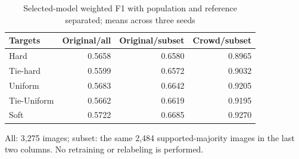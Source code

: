 \begin{table}[t]
\caption{Selected-model weighted F1 with population and reference separated; means across three seeds}\label{tab:samef1}
\centering\begin{tabular}{lrrr}\toprule
Targets & Original/all & Original/subset & Crowd/subset\\\midrule
Hard & 0.5658 & 0.6580 & 0.8965\\
Tie-hard & 0.5599 & 0.6572 & 0.9032\\
Uniform & 0.5683 & 0.6642 & 0.9205\\
Tie-Uniform & 0.5662 & 0.6619 & 0.9195\\
Soft & 0.5722 & 0.6685 & 0.9270\\
\bottomrule\end{tabular}
All: 3,275 images; subset: the same 2,484 supported-majority images in the last two columns. No retraining or relabeling is performed.
\end{table}

